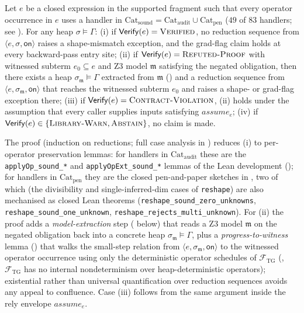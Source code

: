 \begin{theorem}
\label{thm:soundness}
Let $e$ be a closed expression in the supported fragment such that
every operator occurrence in $e$ uses a handler in
$\mathrm{Cat}_{\mathrm{sound}}=\mathrm{Cat}_{\mathrm{audit}}\cup\mathrm{Cat}_{\mathrm{pen}}$
($49$ of $83$ handlers; see ). For any
heap $\sigma\models\Gamma$:
(i) if $\mathsf{Verify}(e)=\textsc{Verified}$, no reduction
sequence from $\langle e,\sigma,\mathsf{on}\rangle$ raises a
shape-mismatch exception, and the grad-flag claim holds at
every backward-pass entry site;
(ii) if $\mathsf{Verify}(e)=\textsc{Refuted-Proof}$ with
witnessed subterm $e_0\subseteq e$ and Z3 model $\mathfrak{m}$
satisfying the negated obligation, then there exists a heap
$\sigma_{\mathfrak{m}}\models\Gamma$ extracted from
$\mathfrak{m}$ () and a reduction
sequence from
$\langle e,\sigma_{\mathfrak{m}},\mathsf{on}\rangle$ that
reaches the witnessed subterm $e_0$ and raises a shape- or
grad-flag exception there;
(iii) if $\mathsf{Verify}(e)=\textsc{Contract-Violation}$, (ii)
holds under the assumption that every caller supplies inputs
satisfying $\mathit{assume}_e$;
(iv) if $\mathsf{Verify}(e)\in\{\textsc{Library-Warn},\textsc{Abstain}\}$,
no claim is made.
\end{theorem}
The proof (induction on reductions; full case analysis in
) reduces (i) to per-operator
preservation lemmas: for handlers in $\mathrm{Cat}_{\mathrm{audit}}$
these are the \texttt{applyOp\_sound\_*} and
\texttt{applyOpExt\_sound\_*} lemmas of the Lean development
(); for handlers in $\mathrm{Cat}_{\mathrm{pen}}$
they are the closed pen-and-paper sketches in
, two of which (the divisibility and
single-inferred-dim cases of \texttt{reshape}) are also
mechanised as closed Lean theorems
(\texttt{reshape\_sound\_zero\_unknowns},
\texttt{reshape\_sound\_one\_unknown},
\texttt{reshape\_rejects\_multi\_unknown}). For (ii) the proof
adds a \emph{model-extraction} step
( below) that reads a Z3 model
$\mathfrak{m}$ on the negated obligation back into a concrete
heap $\sigma_{\mathfrak{m}}\models\Gamma$, plus a
\emph{progress-to-witness} lemma
() that walks the small-step
relation from $\langle
e,\sigma_{\mathfrak{m}},\mathsf{on}\rangle$ to the witnessed
operator occurrence using only the deterministic operator
schedules of $\mathcal{F}_{\mathrm{TG}}$ (,
$\mathcal{F}_{\mathrm{TG}}$ has no internal nondeterminism over
heap-deterministic operators); existential rather than
universal quantification over reduction sequences avoids any
appeal to confluence.
Case (iii)
follows from the same argument inside the rely envelope
$\mathit{assume}_e$.

